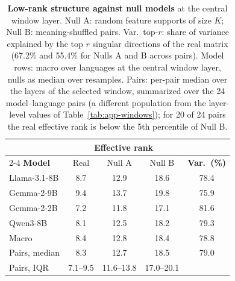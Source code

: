 \begin{table}[!htbp]
  \centering
  \footnotesize
  \setlength{\tabcolsep}{3.5pt}
  \begin{tabular}{@{}lcccc@{}}
    \toprule
    & \multicolumn{3}{c}{\textbf{Effective rank}} & \\
    \cmidrule(lr){2-4}
    \textbf{Model} & Real & Null A & Null B & \textbf{Var.\ (\%)} \\
    \midrule
    Llama-3.1-8B & 8.7 & 12.9 & 18.6 & 78.4 \\
    Gemma-2-9B & 9.4 & 13.7 & 19.8 & 75.9 \\
    Gemma-2-2B & 7.2 & 11.8 & 17.1 & 81.6 \\
    Qwen3-8B & 8.1 & 12.5 & 18.2 & 79.3 \\
    \midrule
    Macro & 8.4 & 12.8 & 18.4 & 78.8 \\
    \midrule
    Pairs, median & 8.3 & 12.7 & 18.5 & 79.0 \\
    Pairs, IQR    & 7.1--9.5 & 11.6--13.8 & 17.0--20.1 & \\
    \bottomrule
  \end{tabular}
  \caption{\textbf{Low-rank structure against null models} at the central window layer. Null A: random feature supports of size $K$; Null B: meaning-shuffled pairs. Var.\ top-$r$: share of variance explained by the top $r$ singular directions of the real matrix (67.2\% and 55.4\% for Nulls A and B across pairs). Model rows: macro over languages at the central window layer, nulls as median over resamples. Pairs: per-pair median over the layers of the selected window, summarized over the 24 model--language pairs (a different population from the layer-level values of Table~\ref{tab:app-windows}); for 20 of 24 pairs the real effective rank is below the 5th percentile of Null B.}
  \label{tab:app-lowrank}
\end{table}

